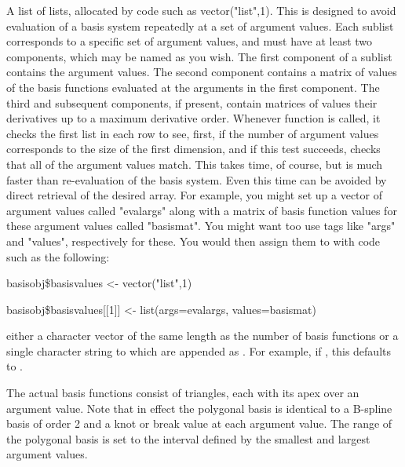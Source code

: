 \documentclass{article}
\begin{document}
\begin{Arguments}
\begin{ldescription}
\item[\code{basisvalues}] A list of lists, allocated by code such as vector("list",1).  This
is designed to avoid evaluation of a basis system repeatedly
at a set of argument values.  Each sublist corresponds to a specific
set of argument values, and must have at least two components, which
may be named as you wish.  The first component of a sublist contains
the argument values.  The second component contains a matrix of
values of the basis functions evaluated at the arguments in the
first component.  The third and subsequent components, if present,
contain matrices of values their derivatives up to a maximum
derivative order.  Whenever function  is
called, it checks the first list in each row to see, first, if the
number of argument values corresponds to the size of the first
dimension, and if this test succeeds, checks that all of the
argument values match.  This takes time, of course, but is much
faster than re-evaluation of the basis system.  Even this time can
be avoided by direct retrieval of the desired array. For example,
you might set up a vector of argument values called "evalargs" along
with a matrix of basis function values for these argument values
called "basismat".  You might want too use tags like "args" and
"values", respectively for these.  You would then assign them to
 with code such as the following:

basisobj\$basisvalues <- vector("list",1)

basisobj\$basisvalues[[1]] <- list(args=evalargs, values=basismat)

\item[\code{names}] either a character vector of the same length as the number of basis
functions or a single character string to which  are
appended as .  For example, if
, this defaults to .

\end{ldescription}
\end{Arguments}
\begin{Details}\relax
The actual basis functions consist of triangles, each with its apex
over an argument value. Note that in effect the polygonal basis is
identical to a B-spline basis of order 2 and a knot or break value at
each argument value.  The range of the polygonal basis is set to the
interval defined by the smallest and largest argument values.
\end{Details}
\end{document}
